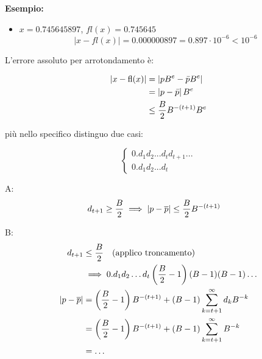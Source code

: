 \documentclass[a4paper, 11pt]{article}
\begin{document}
        \textbf{Esempio:}

        \begin{itemize}
            \item $x =0.745645897$, $fl(x)=0.745645 $
            \[
                |x-fl(x)| = 0.000000897 = 0.897\cdot10^{-6} < 10^{-6}
            \]
        \end{itemize}


        L'errore assoluto per arrotondamento è: 



        \begin{align}
            \left| x - \text{fl}(x) \right| &= \left| pB^e - \bar{p}B^e \right| \notag \\
            &= \left| p - \bar{p} \right| B^e \notag \\
            &\leq \frac{B}{2} B^{-(t+1)} B^e \notag
        \end{align}

        più nello specifico distinguo due casi:

        \[
            \begin{cases}
                0.d_1d_2...d_td_{t+1}... \\
                0.d_1d_2...d_t
            \end{cases}
        \]    

        A: 
        \begin{align}
            d_{t+1} &\geq \frac{B}{2} \implies |p-\overline{p}| \leq \frac{B}{2}B^{-(t+1)} \notag
        \end{align}

        B:
        \begin{align}
            d_{t+1} &\leq \frac{B}{2} \quad \text{(applico troncamento)} \notag \\
            &\implies 0.d_1d_2\ldots d_t \left( \frac{B}{2} - 1 \right) (B-1)(B-1)\ldots \notag \\
            |p-\overline{p}| &= \left( \frac{B}{2} - 1 \right) B^{-(t+1)} + (B-1) \sum_{k = t+1}^{\infty} d_k B^{-k} \notag \\
            &= \left( \frac{B}{2} - 1 \right) B^{-(t+1)} + (B-1) \sum_{k = t+1}^{\infty} B^{-k} \notag \\
            &= \ldots \notag
        \end{align}
        
        
        
        
\end{document}
